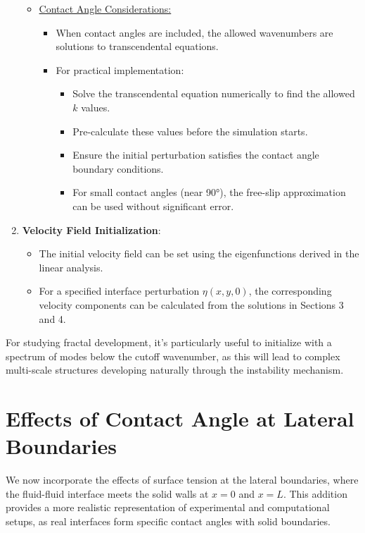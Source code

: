 \documentclass[12pt,a4paper]{article}
\begin{document}
\begin{enumerate}
\begin{itemize}
        \item \underline{Contact Angle Considerations:}
            \begin{itemize}
                \item When contact angles are included, the allowed wavenumbers are solutions to transcendental equations.
                \item For practical implementation:
                \begin{itemize}
                    \item Solve the transcendental equation numerically to find the allowed $k$ values.
                    \item Pre-calculate these values before the simulation starts.
                    \item Ensure the initial perturbation satisfies the contact angle boundary conditions.
                    \item For small contact angles (near 90°), the free-slip approximation can be used without significant error.
                \end{itemize}
            \end{itemize}
    \end{itemize}
    
    \item \textbf{Velocity Field Initialization}:
    \begin{itemize}
        \item The initial velocity field can be set using the eigenfunctions derived in the linear analysis.
        \item For a specified interface perturbation $\eta(x,y,0)$, the corresponding velocity components can be calculated from the solutions in Sections 3 and 4.
    \end{itemize}
\end{enumerate}

For studying fractal development, it's particularly useful to initialize with a spectrum of modes below the cutoff wavenumber, as this will lead to complex multi-scale structures developing naturally through the instability mechanism.

\section{Effects of Contact Angle at Lateral Boundaries}
We now incorporate the effects of surface tension at the lateral boundaries, where the fluid-fluid interface meets the solid walls at $x = 0$ and $x = L$. This addition provides a more realistic representation of experimental and computational setups, as real interfaces form specific contact angles with solid boundaries.
\end{document}
